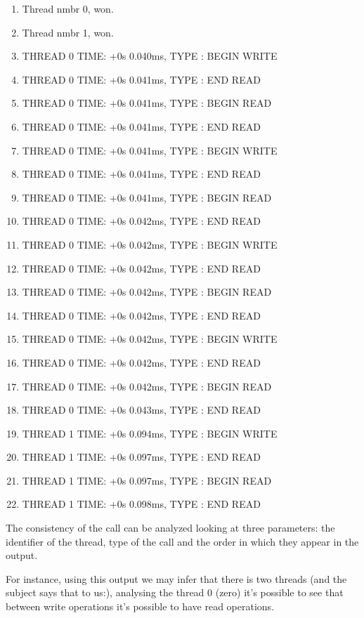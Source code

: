 \documentclass{article}
\begin{document}
\begin{enumerate}
      \item Thread nmbr 0, won.
      \item Thread nmbr 1, won.
      \item THREAD 0 TIME: +0s 0.040ms, TYPE : BEGIN WRITE
      \item THREAD 0 TIME: +0s 0.041ms, TYPE : END READ
      \item THREAD 0 TIME: +0s 0.041ms, TYPE : BEGIN READ
      \item THREAD 0 TIME: +0s 0.041ms, TYPE : END READ
      \item THREAD 0 TIME: +0s 0.041ms, TYPE : BEGIN WRITE
      \item THREAD 0 TIME: +0s 0.041ms, TYPE : END READ
      \item THREAD 0 TIME: +0s 0.041ms, TYPE : BEGIN READ
      \item THREAD 0 TIME: +0s 0.042ms, TYPE : END READ
      \item THREAD 0 TIME: +0s 0.042ms, TYPE : BEGIN WRITE
      \item THREAD 0 TIME: +0s 0.042ms, TYPE : END READ
      \item THREAD 0 TIME: +0s 0.042ms, TYPE : BEGIN READ
      \item THREAD 0 TIME: +0s 0.042ms, TYPE : END READ
      \item THREAD 0 TIME: +0s 0.042ms, TYPE : BEGIN WRITE
      \item THREAD 0 TIME: +0s 0.042ms, TYPE : END READ
      \item THREAD 0 TIME: +0s 0.042ms, TYPE : BEGIN READ
      \item THREAD 0 TIME: +0s 0.043ms, TYPE : END READ
      \item THREAD 1 TIME: +0s 0.094ms, TYPE : BEGIN WRITE
      \item THREAD 1 TIME: +0s 0.097ms, TYPE : END READ
      \item THREAD 1 TIME: +0s 0.097ms, TYPE : BEGIN READ
      \item THREAD 1 TIME: +0s 0.098ms, TYPE : END READ   
\end{enumerate}

The consistency of the call can be analyzed looking at three parameters: the identifier of 
the thread, type of the call and the order in which they appear in the output.

For instance, using this output we may infer that there is two threads (and the subject says 
that to us:), analysing the thread 0 (zero) it's possible to see that between write operations
it's possible to have read operations.
\end{document}

